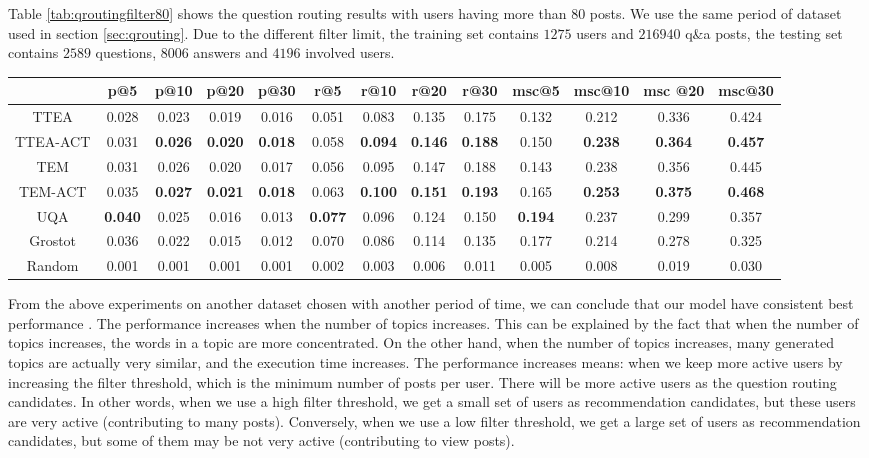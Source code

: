 {{{{{{{Table \ref{tab:qroutingfilter80} shows the question routing results with users having more than 80 posts. We use the same period of dataset used in section \ref{sec:qrouting}. Due to the different filter limit, the training set contains $1275$ users and $216940$ q\&a posts, the testing set contains $2589$ questions, $8006$ answers and $4196$ involved users.
\begin{sidewaystable}
\caption{Question Routing experiments,  with users having more than 80 posts}
\label{tab:qroutingfilter80}
\centering
\begin{tabular}{|c|c|c|c|c|c|c|c|c|c|c|c|c|}
\hline
 & p@5    &p@10    &p@20   & p@30 &r@5 & r@10 & r@20 &r@30 & msc@5 & msc@10 &msc @20 &msc@30  \\ \hline
TTEA&0.028&0.023&0.019&0.016&0.051&0.083&0.135&0.175&0.132&0.212&0.336&0.424 \\ \hline
TTEA-ACT&0.031&\textbf{0.026}&\textbf{0.020}&\textbf{0.018}&0.058&\textbf{0.094}&\textbf{0.146}&\textbf{0.188}&0.150&\textbf{0.238}&\textbf{0.364}&\textbf{0.457} \\ \hline
TEM&0.031&0.026&0.020&0.017&0.056&0.095&0.147&0.188&0.143&0.238&0.356&0.445 \\ \hline
TEM-ACT&0.035&\textbf{0.027}&\textbf{0.021}&\textbf{0.018}&0.063&\textbf{0.100}&\textbf{0.151}&\textbf{0.193}&0.165  &\textbf{0.253}&\textbf{0.375}&\textbf{0.468} \\ \hline
UQA&\textbf{0.040}&0.025&0.016&0.013&\textbf{0.077}&0.096&0.124&0.150&\textbf{0.194}&0.237&0.299&0.357 \\ \hline
Grostot&0.036&0.022&0.015&0.012&0.070&0.086&0.114&0.135&0.177&0.214&0.278&0.325 \\ \hline
Random&0.001&0.001&0.001&0.001&0.002&0.003&0.006&0.011&0.005&0.008&0.019&0.030 \\ \hline
\end{tabular}
\end{sidewaystable}


From the above experiments on another dataset chosen with another period of time, we can conclude that our model have consistent best performance . 
The performance increases when the number of topics increases. This can be explained by the fact that when the number of topics increases, the words in a topic are more concentrated. On the other hand, when the number of topics increases, many generated topics are actually very similar, and the execution time increases. 
The performance increases means: when we keep more active users by increasing the filter threshold, which is the minimum number of posts per user. There will be more active users as the question routing candidates. In other words, when we use a high filter threshold, we get a small set of users as recommendation candidates, but these users are very active (contributing to many posts). Conversely, when we use a low filter threshold, we get a large set of users as recommendation candidates, but some of them may be not very active (contributing to view posts). 



}}}}}}}
